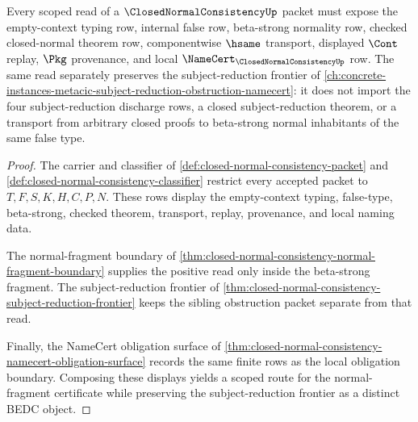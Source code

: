 \begin{theorem}
\label{thm:closed-normal-consistency-scoped-route}
Every scoped read of a $\ClosedNormalConsistencyUp$ packet must expose the empty-context typing row, internal false row, beta-strong normality row, checked closed-normal theorem row, componentwise $\hsame$ transport, displayed $\Cont$ replay, $\Pkg$ provenance, and local $\NameCert_{\ClosedNormalConsistencyUp}$ row. The same read separately preserves the subject-reduction frontier of \autoref{ch:concrete-instances-metacic-subject-reduction-obstruction-namecert}: it does not import the four subject-reduction discharge rows, a closed subject-reduction theorem, or a transport from arbitrary closed proofs to beta-strong normal inhabitants of the same false type.
\end{theorem}
\begin{proof}
The carrier and classifier of \autoref{def:closed-normal-consistency-packet} and \autoref{def:closed-normal-consistency-classifier} restrict every accepted packet to $T,F,S,K,H,C,P,N$. These rows display the empty-context typing, false-type, beta-strong, checked theorem, transport, replay, provenance, and local naming data.

The normal-fragment boundary of \autoref{thm:closed-normal-consistency-normal-fragment-boundary} supplies the positive read only inside the beta-strong fragment. The subject-reduction frontier of \autoref{thm:closed-normal-consistency-subject-reduction-frontier} keeps the sibling obstruction packet separate from that read.

Finally, the NameCert obligation surface of \autoref{thm:closed-normal-consistency-namecert-obligation-surface} records the same finite rows as the local obligation boundary. Composing these displays yields a scoped route for the normal-fragment certificate while preserving the subject-reduction frontier as a distinct BEDC object.
\end{proof}

